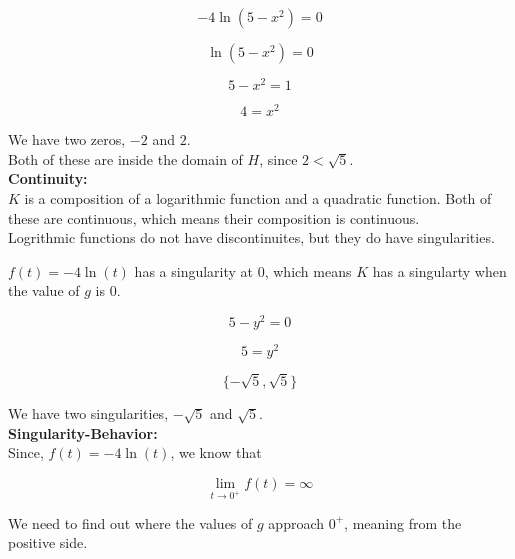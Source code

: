 \documentclass{ximera}
\begin{document}
\[
-4 \ln(5 - x^2) = 0
\]


\[
 \ln(5 - x^2) = 0
\]


\[
5 - x^2 = 1
\]


\[
4 = x^2
\]


We have two zeros, $-2$ and $2$. \\

Both of these are inside the domain of $H$, since $2 < \sqrt{5}$. \\













\textbf{\textcolor{blue!55!black}{Continuity:}} \\


$K$ is a composition of a logarithmic function and a quadratic function.  Both of these are continuous, which means their composition is continuous. \\

Logrithmic functions do not have discontinuites, but they do have singularities.  


$f(t) = -4\ln(t)$ has a singularity at $0$, which means $K$ has a singularty when the value of $g$ is $0$.



\[
5 - y^2 = 0
\]



\[
5 = y^2
\]



\[
\{ -\sqrt{5}, \sqrt{5} \}
\]

We have two singularities, $-\sqrt{5}$ and $\sqrt{5}$. \\












\textbf{\textcolor{blue!55!black}{Singularity-Behavior:}} \\



Since, $f(t) = -4 \ln(t)$, we know that 


\[
\lim\limits_{t \to 0^+} f(t) = \infty
\]



We need to find out where the values of $g$ approach $0^+$, meaning from the positive side. \\
\end{document}
